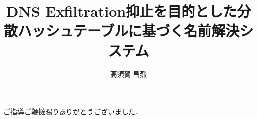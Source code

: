 \documentclass[12pt]{jarticle} %
\title{DNS Exfiltration抑止を目的とした分散ハッシュテーブルに基づく名前解決システム}
\author{高須賀 昌烈}
\begin{document}
\titlepage
\cmemberspage
\firstabstract
\secondabstract



\toc
\newpage
\listoffigures
\listoftables



\newpage
{}











\newpage
\acknowledgements
ご指導ご鞭撻賜りありがとうございました．
\end{document}
